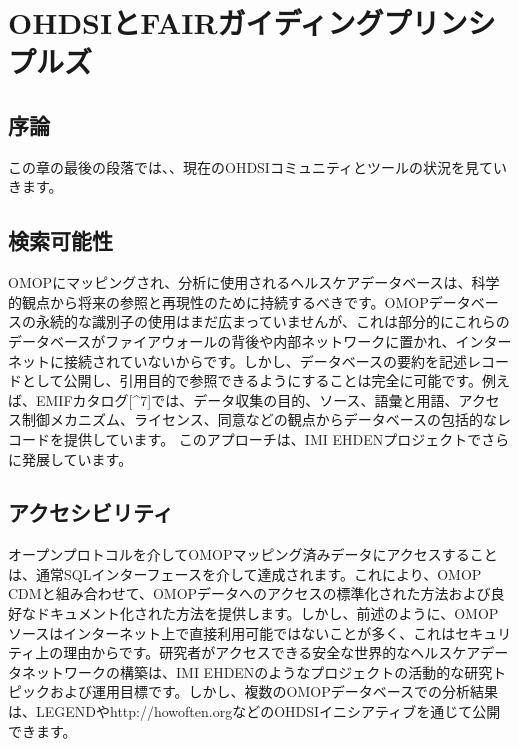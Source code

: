 \documentclass[
  11pt]{book}
\theoremstyle{definition}
\theoremstyle{definition}
\theoremstyle{definition}
\theoremstyle{definition}
\theoremstyle{remark}
\begin{document}
\section{OHDSIとFAIRガイディングプリンシプルズ}\label{ohdsiux3068fairux30acux30a4ux30c7ux30a3ux30f3ux30b0ux30d7ux30eaux30f3ux30b7ux30d7ux30ebux30ba}


\subsection{序論}\label{ux5e8fux8ad6}

この章の最後の段落では、\citet{wilkinson2016で公表されたFAIRデータガイドラインを使用して}、現在のOHDSIコミュニティとツールの状況を見ていきます。

\subsection{検索可能性}\label{ux691cux7d22ux53efux80fdux6027}

OMOPにマッピングされ、分析に使用されるヘルスケアデータベースは、科学的観点から将来の参照と再現性のために持続するべきです。OMOPデータベースの永続的な識別子の使用はまだ広まっていませんが、これは部分的にこれらのデータベースがファイアウォールの背後や内部ネットワークに置かれ、インターネットに接続されていないからです。しかし、データベースの要約を記述レコードとして公開し、引用目的で参照できるようにすることは完全に可能です。例えば、EMIFカタログ{[}\^{}7{]}では、データ収集の目的、ソース、語彙と用語、アクセス制御メカニズム、ライセンス、同意などの観点からデータベースの包括的なレコードを提供しています。\citep{Oliveira2019} このアプローチは、IMI EHDENプロジェクトでさらに発展しています。

\subsection{アクセシビリティ}\label{ux30a2ux30afux30bbux30b7ux30d3ux30eaux30c6ux30a3}

オープンプロトコルを介してOMOPマッピング済みデータにアクセスすることは、通常SQLインターフェースを介して達成されます。これにより、OMOP CDMと組み合わせて、OMOPデータへのアクセスの標準化された方法および良好なドキュメント化された方法を提供します。しかし、前述のように、OMOPソースはインターネット上で直接利用可能ではないことが多く、これはセキュリティ上の理由からです。研究者がアクセスできる安全な世界的なヘルスケアデータネットワークの構築は、IMI EHDENのようなプロジェクトの活動的な研究トピックおよび運用目標です。しかし、複数のOMOPデータベースでの分析結果は、LEGENDやhttp://howoften.orgなどのOHDSIイニシアティブを通じて公開できます。
\end{document}
